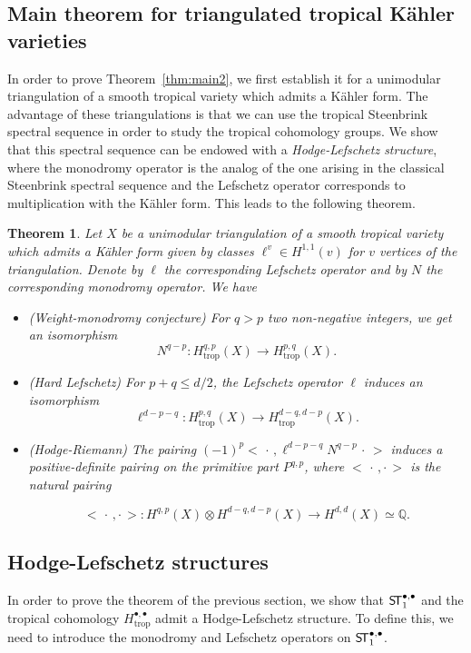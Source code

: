 \documentclass[11pt]{amsart}
\newtheorem{thm}{Theorem}[section]
\theoremstyle{definition}
\numberwithin{equation}{section}
\renewcommand{\~}{\widetilde}
\newcommand{\bul}{\bullet} %
\newcommand{\ccdot}{\,\cdot\,}
\newcommand{\rdot}{\cdot\,}
\newcommand{\trop}{\mathrm{trop}} %
\newcommand{\ST}{\textnormal{\textsf{S\!T}}} %
\begin{document}
\subsection{Main theorem for triangulated tropical K\"ahler varieties}
In order to prove Theorem~\ref{thm:main2}, we first establish it for a unimodular triangulation of a smooth tropical variety which admits a K\"ahler form. The advantage of these triangulations is that we can use the tropical Steenbrink spectral sequence in order to study the tropical cohomology groups. We show that this spectral sequence can be endowed with a \emph{Hodge-Lefschetz structure}, where the monodromy operator is the analog of the one arising in the classical Steenbrink spectral sequence and the Lefschetz operator corresponds to multiplication with the K\"ahler form. This leads to the following theorem.

\begin{thm}\label{thm:main1-intro} Let $X$ be a unimodular triangulation of a smooth tropical variety which admits a K\"ahler form given by classes $\ell^v \in H^{1,1}(v)$ for $v$ vertices of the triangulation. Denote by $\ell$ the corresponding Lefschetz operator and by $N$ the corresponding monodromy operator. We have
\begin{itemize}
\item \emph{(Weight-monodromy conjecture)} For $q>p$ two non-negative integers, we get an isomorphism
\[N^{q-p} \colon H_{\trop}^{q,p}(X) \to H_{\trop}^{p,q}(X).\]

\item \emph{(Hard Lefschetz)} For $p+q \leq d/2$, the Lefschetz operator $\ell$ induces an isomorphism
\[\ell^{d- p-q}\colon H_{\trop}^{p,q}(X) \to H^{d-q, d-p}_{\trop}(X).\]

\item \emph{(Hodge-Riemann)} The pairing $(-1)^p \bigl< \ccdot, \ell^{d-p-q} N^{q-p}\ccdot\bigr>$ induces a positive-definite pairing on the primitive part $P^{q,p}$, where $\bigl< \ccdot, \rdot \bigr>$ is the natural pairing

\[\bigl< \ccdot , \rdot\bigr> \colon H^{q,p}(X) \otimes H^{d-q,d-p}(X) \to H^{d,d}(X) \simeq \mathbb Q.\]
\end{itemize}
\end{thm}



\subsection{Hodge-Lefschetz structures} In order to prove the theorem of the previous section, we show that $\ST_1^{\bul, \bul}$ and the tropical cohomology $H^{\bul,\bul}_\trop$ admit a Hodge-Lefschetz structure. To define this, we need to introduce the monodromy and Lefschetz operators on $\ST_1^{\bul, \bul}$.
\end{document}
